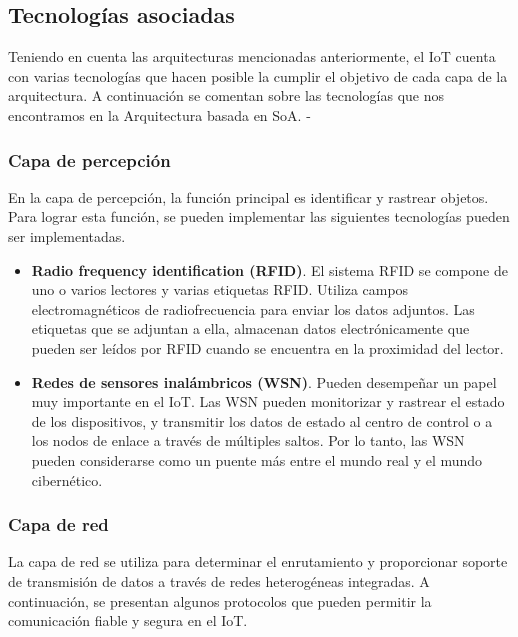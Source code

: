 {\subsection{Tecnologías asociadas}

Teniendo en cuenta las arquitecturas mencionadas anteriormente, el IoT cuenta con varias tecnologías que hacen posible la cumplir el objetivo de cada capa de la arquitectura. A continuación se comentan sobre las tecnologías que nos encontramos en la Arquitectura basada en SoA. \cite{lin2017survey}-\cite{tripathy2017internet}

\subsubsection{Capa de percepción}

En la capa de percepción, la función principal es identificar y rastrear objetos. Para lograr esta función, se pueden implementar las siguientes tecnologías pueden ser implementadas.

\begin{itemize}
    \item \textbf{Radio frequency identification (RFID)}. El sistema RFID se compone de uno o varios lectores y varias etiquetas RFID. Utiliza campos electromagnéticos de radiofrecuencia para enviar los datos adjuntos. Las etiquetas que se adjuntan a ella, almacenan datos electrónicamente que pueden ser leídos por RFID cuando se encuentra en la proximidad del lector. \cite{7589556}
    \item \textbf{Redes de sensores inalámbricos (WSN)}. Pueden desempeñar un papel muy importante en el IoT. Las WSN pueden monitorizar y rastrear el estado de los dispositivos, y transmitir los datos de estado al centro de control o a los nodos de enlace a través de múltiples saltos. Por lo tanto, las WSN pueden considerarse como un puente más entre el mundo real y el mundo cibernético. \cite{lin2017survey}
\end{itemize}

\subsubsection{Capa de red} \label{protocolos}

La capa de red se utiliza para determinar el enrutamiento y proporcionar soporte de transmisión de datos a través de redes heterogéneas integradas. A continuación, se presentan algunos protocolos que pueden permitir la comunicación fiable y segura en el IoT. \cite{lin2017survey}

}
